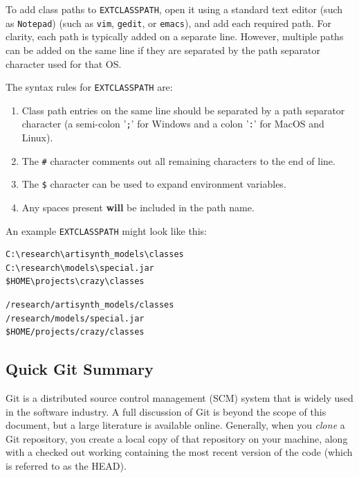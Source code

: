 To add class paths to {\tt EXTCLASSPATH}, open it using a
standard text editor
\ifWindows
(such as {\tt Notepad})
\else
(such as {\tt vim}, {\tt gedit}, or {\tt emacs}),
\fi
and add each required path. For clarity, each path is typically
added on a separate line. However, multiple paths can be
added on the same line if they are separated by the
path separator character used for that OS.

The syntax rules for {\tt EXTCLASSPATH} are:

\begin{enumerate}

\item Class path entries on the same line should be separated by a
path separator character (a semi-colon '{\tt ;}' for Windows
and a colon '{\tt :}' for MacOS and Linux).

\item The {\tt \#} character comments out all remaining characters
to the end of line.

\item The {\tt \$} character can be used to expand environment variables.

\item Any spaces present {\bf will} be included in the path name.

\end{enumerate}

An example {\tt EXTCLASSPATH} might look like this:

\ifWindows
\begin{verbatim}
C:\research\artisynth_models\classes
C:\research\models\special.jar
$HOME\projects\crazy\classes
\end{verbatim}
\else
\begin{verbatim}
/research/artisynth_models/classes
/research/models/special.jar
$HOME/projects/crazy/classes
\end{verbatim}
\fi

\subsection{Quick Git Summary}
\label{GitSummary}

Git is a distributed source control management (SCM) system that is
widely used in the software industry.  A full discussion of Git is
beyond the scope of this document, but a large literature is available
online. Generally, when you {\it clone} a Git repository, you create a
local copy of that repository on your machine, along with a checked
out working \directory{} containing the most recent version of the code
(which is referred to as the HEAD).

